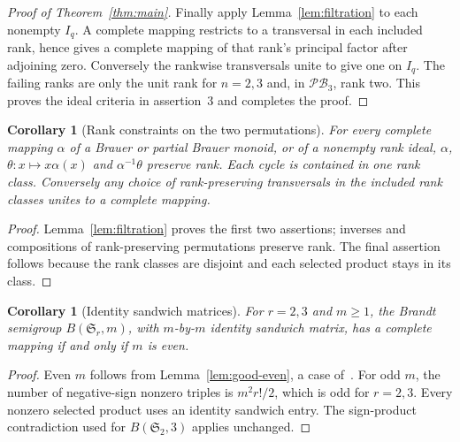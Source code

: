 \documentclass[11pt,a4paper]{article}
\newtheorem{corollary}[theorem]{Corollary}
\newcommand{\PB}{\mathcal{PB}}
\newcommand{\Sym}{\mathfrak S}
\begin{document}
\begin{proof}[Proof of Theorem~\ref{thm:main}]
Finally apply Lemma~\ref{lem:filtration} to each nonempty $I_q$. A complete mapping restricts to a transversal in each included rank, hence gives a complete mapping of that rank's principal factor after adjoining zero. Conversely the rankwise transversals unite to give one on $I_q$. The failing ranks are only the unit rank for $n=2,3$ and, in $\PB_3$, rank two. This proves the ideal criteria in assertion~3 and completes the proof.
\end{proof}

\begin{corollary}[Rank constraints on the two permutations]\label{cor:cycles}
For every complete mapping $\alpha$ of a Brauer or partial Brauer monoid, or of a nonempty rank ideal, $\alpha$, $\theta:x\mapsto x\alpha(x)$ and $\alpha^{-1}\theta$ preserve rank. Each cycle is contained in one rank class. Conversely any choice of rank-preserving transversals in the included rank classes unites to a complete mapping.
\end{corollary}
\begin{proof}
Lemma~\ref{lem:filtration} proves the first two assertions; inverses and compositions of rank-preserving permutations preserve rank. The final assertion follows because the rank classes are disjoint and each selected product stays in its class.
\end{proof}

\begin{corollary}[Identity sandwich matrices]\label{cor:brandt}
For $r=2,3$ and $m\ge1$, the Brandt semigroup $B(\Sym_r,m)$, with $m$-by-$m$ identity sandwich matrix, has a complete mapping if and only if $m$ is even.
\end{corollary}
\begin{proof}
Even $m$ follows from Lemma~\ref{lem:good-even}, a case of~\cite[Corollary~7.6]{ABCHK}. For odd $m$, the number of negative-sign nonzero triples is $m^2 r!/2$, which is odd for $r=2,3$. Every nonzero selected product uses an identity sandwich entry. The sign-product contradiction used for $B(\Sym_2,3)$ applies unchanged.
\end{proof}
\end{document}
